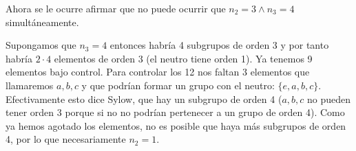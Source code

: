 \begin{ej}
\begin{itemize}
	Ahora se le ocurre afirmar que no puede ocurrir que $n_2 = 3 \land n_3 = 4$ simultáneamente.
	
	Supongamos que $n_3 = 4$ entonces habría 4 subgrupos de orden 3 y por tanto habría $2 \cdot 4$ elementos de orden 3 (el neutro tiene orden 1). Ya tenemos 9 elementos bajo control. Para controlar los 12 nos faltan 3 elementos que llamaremos $a,b,c$ y que podrían formar un grupo con el neutro: $\{e, a, b, c\}$. Efectivamente esto dice Sylow, que hay un subgrupo de orden 4 ($a,b,c$ no pueden tener orden 3 porque si no no podrían pertenecer a un grupo de orden 4). Como ya hemos agotado los elementos, no es posible que haya más subgrupos de orden 4, por lo que necesariamente $n_2 = 1$. 
	\end{itemize}
\end{ej}
